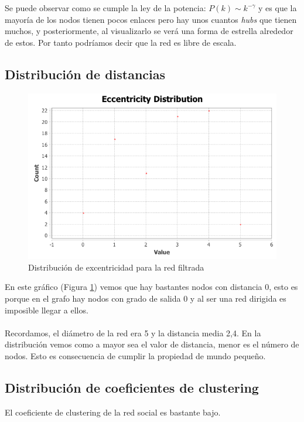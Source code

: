 Se puede observar como se cumple la ley de la potencia: $ P(k) \sim k^{-\gamma} $ y es que la mayoría de los nodos tienen pocos enlaces pero hay unos cuantos \textit{hubs} que tienen muchos, y posteriormente, al visualizarlo se verá una forma de estrella alrededor de estos. Por tanto podríamos decir que la red es libre de escala.

\subsection{Distribución de distancias}

\begin{figure}[H]
	\centering
	\includegraphics[width=12cm]{../images/eccentricity-distribution}
	\caption{Distribución de excentricidad para la red filtrada}
	\label{fig:eccentricity-distribution}
\end{figure}

En este gráfico (Figura \ref{fig:eccentricity-distribution}) vemos que hay bastantes nodos con distancia 0, esto es porque en el grafo hay nodos con grado de salida 0 y al ser una red dirigida es imposible llegar a ellos.
\\ \\
Recordamos, el diámetro de la red era 5 y la distancia media 2,4. En la distribución vemos como a mayor sea el valor de distancia, menor es el número de nodos. Esto es consecuencia de cumplir la propiedad de mundo pequeño. 

\subsection{Distribución de coeficientes de clustering}

El coeficiente de clustering de la red social es bastante bajo.
\\ \\

